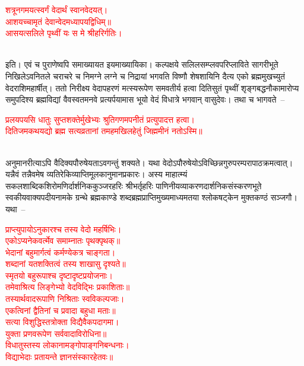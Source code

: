 \centering\textcolor{red}{शत्रूनगमयत्स्वर्गं वेदार्थं स्वानवेदयत्। \nopagebreak\\
आशयच्चामृतं देवान्वेदमध्यापयद्विधिम्॥ \nopagebreak\\
आसयत्सलिले पृथ्वीं यः स मे श्रीहरिर्गतिः।}\nopagebreak\\
\\
\begin{sloppypar}\justifying\noindent\hspace{10mm} इति। एवं च पुराणेष्वपि समाख्यायत इयमाख्यायिका। कल्प\-क्षये सलिल\-सम्प्लव\-परिप्लाविते सागरीभूते निखिलेऽवनि\-तले चराचरे च निमग्ने लग्ने च निद्रायां भगवति विष्णौ शेष\-शायिनि दैत्य एको ब्रह्म\-मुख\-च्युतं वेदराशिमहार्षीत्। ततो निरीक्ष्य वेदापहरणं मत्स्य\-रूपेण समवतीर्य हत्वा दिति\-सुतं पृथ्वीं शृङ्ग\-बद्ध\-नौकामारोप्य समुपदिश्य ब्रह्मविद्यां वैवस्वतमनवे प्रत्यर्पयामास भूयो वेदं विधात्रे भगवान् वासुदेवः। तथा च भागवते~–\end{sloppypar}
\centering\textcolor{red}{प्रलयपयसि धातुः सुप्तशक्तेर्मुखेभ्यः श्रुतिगणमपनीतं प्रत्युपादत्त हत्वा।\nopagebreak\\
दितिजमकथयद्यो ब्रह्म सत्यव्रतानां तमहमखिलहेतुं जिह्ममीनं नतोऽस्मि॥}\nopagebreak\\
\\
\begin{sloppypar}\justifying\noindent\hspace{10mm} अनुमानरीत्याऽपि वैदिक्यपौरुषेयताऽवगन्तुं शक्यते। यथा वेदोऽपौरुषेयोऽविच्छिन्न\-गुरुपरम्परा\-पाठक्रमत्वात्। यन्नैवं तन्नैवमेष व्यतिरेकि\-व्याप्ति\-मूलकानुमान\-प्रकारः। अस्य माहात्म्यं सकल\-शाब्दिक\-शिरोमणि\-र्दार्शनिक\-कुञ्जर\-हरिः श्रीभर्तृहरिः पाणिनीय\-व्याकरण\-दार्शनिक\-संस्करण\-भूते स्वकीय\-वाक्यपदीय\-नामके ग्रन्थे ब्रह्मकाण्डे शब्दब्रह्म\-प्राप्ति\-मुख्य\-माध्यमतया श्लोक\-षट्केन मुक्तकण्ठं सञ्जगौ। यथा~–\end{sloppypar}
\centering\textcolor{red}{प्राप्त्युपायोऽनुकारश्च तस्य वेदो महर्षिभिः। \nopagebreak\\
एकोऽप्यनेकवर्त्मेव समाम्नातः पृथक्पृथक्॥\\
भेदानां बहुमार्गत्वं कर्मण्येकत्र चाङ्गता।\nopagebreak\\
शब्दानां यतशक्तित्वं तस्य शाखासु दृश्यते॥\\
स्मृतयो बहुरूपाश्च दृष्टादृष्टप्रयोजनाः।\nopagebreak\\
तमेवाश्रित्य लिङ्गेभ्यो वेदविद्भिः प्रकाशिताः॥\\
तस्यार्थवादरूपाणि निश्रिताः स्वविकल्पजाः।\nopagebreak\\
एकत्विनां द्वैतिनां च प्रवादा बहुधा मताः॥\\
सत्या विशुद्धिस्तत्रोक्ता विद्यैवैकपदागमा।\nopagebreak\\
युक्ता प्रणवरूपेण सर्ववादाविरोधिना॥\\
विधातुस्तस्य लोकानामङ्गोपाङ्गनिबन्धनाः।\nopagebreak\\
विद्याभेदाः प्रतायन्ते ज्ञानसंस्कारहेतवः॥}\nopagebreak\\
